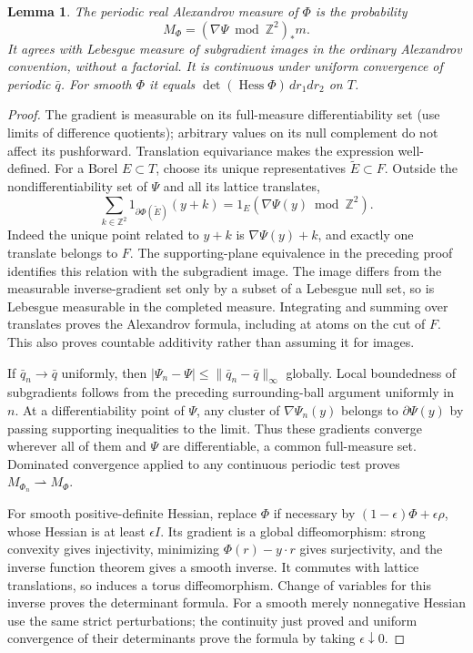 \documentclass[11pt]{article}
\newtheorem{lemma}[theorem]{Lemma}
\begin{document}
\begin{lemma}\label{newrad:Alex}
The periodic real Alexandrov measure of $\Phi$ is the probability
\[
 M_\Phi=(\nabla\Psi\bmod\mathbb Z^2)_*m.
\]
It agrees with Lebesgue measure of subgradient images in the ordinary
Alexandrov convention, without a factorial. It is continuous under
uniform convergence of periodic $\bar q$. For smooth $\Phi$ it equals
$\det(\operatorname{Hess}\Phi)\,dr_1dr_2$ on $T$.
\end{lemma}
\begin{proof}
The gradient is measurable on its full-measure differentiability set
(use limits of difference quotients); arbitrary values on its null
complement do not affect its pushforward. Translation equivariance
makes the expression well-defined. For a Borel $E\subset T$, choose
its unique representatives $\widetilde E\subset F$. Outside the
nondifferentiability set of $\Psi$ and all its lattice translates,
\[
 \sum_{k\in\mathbb Z^2}
 1_{\partial\Phi(\widetilde E)}(y+k)
 =1_E(\nabla\Psi(y)\bmod\mathbb Z^2).
\]
Indeed the unique point related to $y+k$ is $\nabla\Psi(y)+k$, and
exactly one translate belongs to $F$. The supporting-plane equivalence
in the preceding proof identifies this relation with the subgradient
image. The image differs from the measurable inverse-gradient set
only by a subset of a Lebesgue null set, so is Lebesgue measurable in
the completed measure. Integrating and summing over translates proves
the Alexandrov formula, including at atoms on the cut of $F$. This
also proves countable additivity rather than assuming it for images.

If $\bar q_n\to\bar q$ uniformly, then
$|\Psi_n-\Psi|\le\|\bar q_n-\bar q\|_\infty$ globally. Local
boundedness of subgradients follows from the preceding surrounding-ball
argument uniformly in $n$. At a differentiability point of $\Psi$,
any cluster of $\nabla\Psi_n(y)$ belongs to $\partial\Psi(y)$ by
passing supporting inequalities to the limit. Thus these gradients
converge wherever all of them and $\Psi$ are differentiable, a common
full-measure set. Dominated convergence applied to any continuous
periodic test proves $M_{\Phi_n}\rightharpoonup M_\Phi$.

For smooth positive-definite Hessian, replace $\Phi$ if necessary by
$(1-\epsilon)\Phi+\epsilon\rho$, whose Hessian is at least
$\epsilon I$. Its gradient is a global diffeomorphism: strong
convexity gives injectivity, minimizing $\Phi(r)-y\cdot r$ gives
surjectivity, and the inverse function theorem gives a smooth inverse.
It commutes with lattice translations, so induces a torus
diffeomorphism. Change of variables for this inverse proves the
determinant formula. For a smooth merely nonnegative Hessian use the
same strict perturbations; the continuity just proved and uniform
convergence of their determinants prove the formula by taking
$\epsilon\downarrow0$.
\end{proof}
\end{document}
